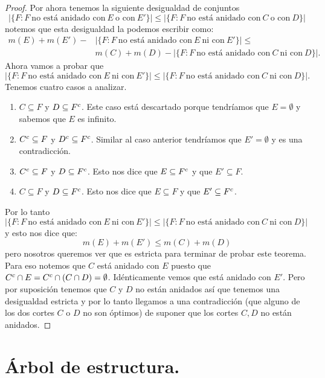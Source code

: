 \documentclass[tesis.tex]{subfiles}
\begin{document}
\begin{proof}
	Por ahora tenemos la siguiente desigualdad de conjuntos
	\[
		|\{ F : F \ \text{no está anidado con} \ E \ \text{o con} \  E' \}| \le |\{ F : F \  \text{no está anidado con} \ C \ \text{o con} \ D \}|
	\]
	notemos que esta desigualdad la podemos escribir como:
	\begin{align*}
		m(E) + m(E') - &|\{ F : F \ \text{no está anidado con} \ E \ \text{ni con} \ E' \}| \le \\
		&m(C) + m(D) - |\{ F : F \ \text{no está anidado con} \ C \ \text{ni con} \ D \}|.
	\end{align*}
	Ahora vamos a probar que 
	\[
		|\{ F : F \ \text{no está anidado con} \ E \ \text{ni con} \ E' \}| \le |\{ F : F \ \text{no está anidado con} \ C \ \text{ni con} \ D \}|.
	\]
	Tenemos cuatro casos a analizar.
	\begin{enumerate}
		\item $C \subseteq F$ y $D \subseteq F^{c}$.
		Este caso está descartado porque tendríamos que $E=\emptyset$ y sabemos que $E$ es infinito. 
		\item $C^{c} \subseteq F$ y $D^{c} \subseteq F^{c}$.
		Similar al caso anterior tendríamos que $E' = \emptyset$ y es una contradicción.
		\item $C^{c} \subseteq F$ y $D \subseteq F^{c}$.
		Esto nos dice que $E \subseteq F^{c}$ y que $E' \subseteq F$.
		\item $ C \subseteq F$ y $D \subseteq F^{c}$.
		Esto nos dice que $E \subseteq F$ y que $E' \subseteq F^{c}$.
	\end{enumerate}
	Por lo tanto $|\{ F : F \ \text{no está anidado con} \ E \ \text{ni con} \ E' \}| \le |\{ F : F \ \text{no está anidado con} \ C \ \text{ni con} \ D \}|$ y esto nos dice que:
	\[
		m(E) + m(E') \le m(C) + m(D)
	\]
	pero nosotros queremos ver que es estricta para terminar de probar este teorema.
	Para eso notemos que $C$ está anidado con $E$ puesto que $C^{c} \cap E = C^{c} \cap (C \cap D) = \emptyset$.
	Idénticamente vemos que está anidado con $E'$.
	Pero por suposición tenemos que $C$ y $D$ no están anidados así que tenemos una desigualdad estricta y por lo tanto llegamos a una contradicción (que alguno de los dos cortes $C$ o $D$ no son óptimos) de suponer que los cortes $C,D$ no están anidados.
\end{proof}

\section{Árbol de estructura.}\label{secc_arbol_estr}
\end{document}
